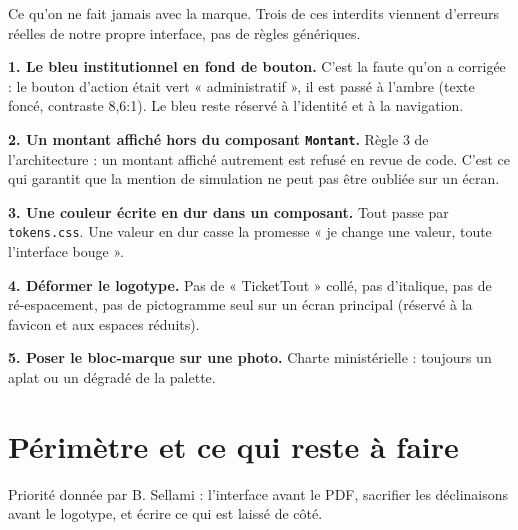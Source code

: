 \documentclass[11pt,a4paper]{article}
\newcommand{\code}[1]{\texttt{\small #1}}
\begin{document}
Ce qu'on ne fait jamais avec la marque. Trois de ces interdits viennent
d'erreurs réelles de notre propre interface, pas de règles génériques.

\begin{interdit}
\textbf{1. Le bleu institutionnel en fond de bouton.} C'est la faute qu'on a
corrigée : le bouton d'action était vert « administratif », il est passé à
l'ambre (texte foncé, contraste 8,6:1). Le bleu reste réservé à l'identité et
à la navigation.
\end{interdit}
\begin{interdit}
\textbf{2. Un montant affiché hors du composant \code{Montant}.} Règle 3 de
l'architecture : un montant affiché autrement est refusé en revue de code.
C'est ce qui garantit que la mention de simulation ne peut pas être oubliée sur
un écran.
\end{interdit}
\begin{interdit}
\textbf{3. Une couleur écrite en dur dans un composant.} Tout passe par
\code{tokens.css}. Une valeur en dur casse la promesse « je change une valeur,
toute l'interface bouge ».
\end{interdit}
\begin{interdit}
\textbf{4. Déformer le logotype.} Pas de « TicketTout » collé, pas d'italique,
pas de ré-espacement, pas de pictogramme seul sur un écran principal (réservé à
la favicon et aux espaces réduits).
\end{interdit}
\begin{interdit}
\textbf{5. Poser le bloc-marque sur une photo.} Charte ministérielle : toujours
un aplat ou un dégradé de la palette.
\end{interdit}
\newpage

\section{Périmètre et ce qui reste à faire}

Priorité donnée par B. Sellami : l'interface avant le PDF, sacrifier les
déclinaisons avant le logotype, et écrire ce qui est laissé de côté.
\end{document}
